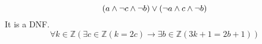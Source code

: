 \documentclass{article}
\begin{document}
$$
	(a \land \lnot c \land \lnot b) \lor (\lnot a \land c \land \lnot b) \\
$$
It is a DNF.
$$
	\forall k \in \mathbb{Z} (\exists c \in \mathbb{Z} (k = 2c) \to \exists b \in \mathbb{Z} (3k+1 = 2b+1))
$$
\end{document}
